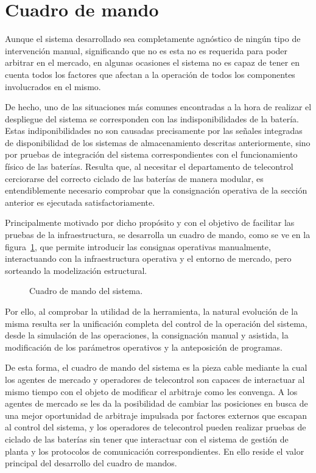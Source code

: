 \section{Cuadro de mando}
\label{makereference6.2}

Aunque el sistema desarrollado sea completamente agnóstico de ningún tipo de intervención manual, significando que no es esta no es requerida para poder arbitrar en el mercado, en algunas ocasiones el sistema no es capaz de tener en cuenta todos los factores que afectan a la operación de todos los componentes involucrados en el mismo.

De hecho, uno de las situaciones más comunes encontradas a la hora de realizar el despliegue del sistema se corresponden con las indisponibilidades de la batería. Estas indiponibilidades no son causadas precisamente por las señales integradas de disponibilidad de los sistemas de almacenamiento descritas anteriormente, sino por pruebas de integración del sistema correspondientes con el funcionamiento físico de las baterías. Resulta que, al necesitar el departamento de telecontrol cerciorarse del correcto ciclado de las baterías de manera modular, es entendiblemente necesario comprobar que la consignación operativa de la sección anterior es ejecutada satisfactoriamente.

Principalmente motivado por dicho propósito y con el objetivo de facilitar las pruebas de la infraestructura, se desarrolla un cuadro de mando, como se ve en la figura~\ref{fig:cuadro-de-mando}, que permite introducir las consignas operativas manualmente, interactuando con la infraestructura operativa y el entorno de mercado, pero sorteando la modelización  estructural.

\begin{figure}
  \centering
  \caption{Cuadro de mando del sistema.}
  \label{fig:cuadro-de-mando}
\end{figure}

Por ello, al comprobar la utilidad de la herramienta, la natural evolución de la misma resulta ser la unificación completa del control de la operación del sistema, desde la simulación de las operaciones, la consignación manual y asistida, la modificación de los parámetros operativos y la anteposición de programas.

De esta forma, el cuadro de mando del sistema es la pieza cable mediante la cual los agentes de mercado y operadores de telecontrol son capaces de interactuar al mismo tiempo con el objeto de modificar el arbitraje como les convenga. A los agentes de mercado se les da la posibilidad de cambiar las posiciones en busca de una mejor oportunidad de arbitraje impulsada por factores externos que escapan al control del sistema, y los operadores de telecontrol pueden realizar pruebas de ciclado de las baterías sin tener que interactuar con el sistema de gestión de planta y los protocolos de comunicación correspondientes. En ello reside el valor principal del desarrollo del cuadro de mandos.

